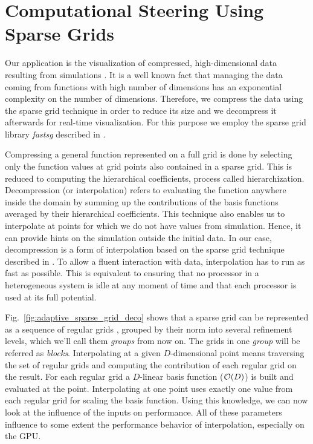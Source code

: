 \section{Computational Steering Using Sparse Grids}


Our application is the visualization of compressed, high-dimensional data
resulting from simulations \cite{butnaru2011}. It is a well known fact that
managing the data coming from functions with high number of dimensions has an
exponential complexity on the number of dimensions. Therefore, we compress the
data using the sparse grid technique in order to reduce its size and we 
decompress it afterwards for real-time visualization. 
For this purpose we employ the sparse grid library \textit{fastsg} described in \cite{murarasu2012}.

Compressing a general function represented on a full grid is done by selecting
only the function values at grid points also contained in a sparse grid. This is
reduced to computing the hierarchical coefficients, process called
hierarchization. Decompression (or interpolation) refers to evaluating the
function anywhere inside the domain by summing up the contributions of the basis
functions averaged by their hierarchical coefficients. This technique also
enables us to interpolate at points for which we do not have values from
simulation. Hence, it can provide hints on the simulation outside the initial
data. In our case, decompression is a form of interpolation based on the sparse
grid technique described in \cite{bungartz2004}. To allow a fluent interaction
with data, interpolation has to run as fast as possible. This is equivalent to
ensuring that no processor in a heterogeneous system is idle at any moment of
time and that each processor is used at its full potential.

Fig.~\ref{fig:adaptive_sparse_grid_deco} shows that a sparse grid can be
represented as a sequence of regular grids \cite{murarasu2011}, grouped by their
norm into several refinement levels, which we'll call them \textit{groups} from
now on. The grids in one \textit{group} will be referred as \textit{blocks}.
Interpolating at a given $D$-dimensional point means traversing the set of
regular grids and computing the contribution of each regular grid on the result. For
each regular grid a $D$-linear basis function ($\Otime{D}$) is built and
evaluated at the point. Interpolating at one point uses exactly one value from each
regular grid for scaling the basis function. Using this knowledge, we can now
look at the influence of the inputs on performance. All of these parameters
influence to some extent the performance behavior of interpolation, especially
on the GPU.

